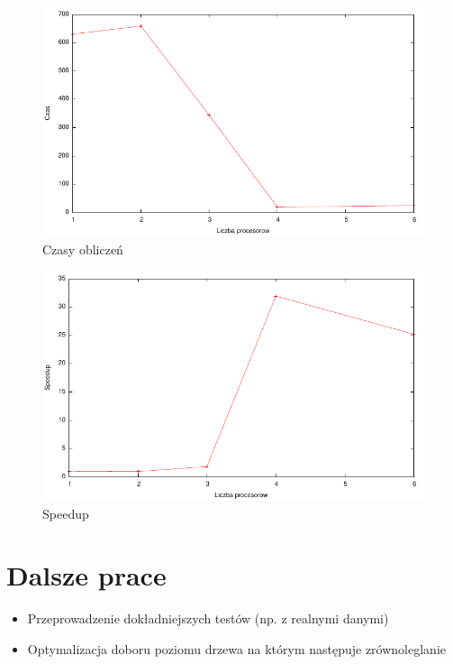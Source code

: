 \documentclass[a4paper]{article}
\begin{document}
\begin{figure}[H] 
   \centering
   \includegraphics[width=0.7\columnwidth]{czas.pdf}
   \caption{Czasy obliczeń}
\end{figure}

\begin{figure}[H] 
   \centering
   \includegraphics[width=0.7\columnwidth]{speedup.pdf}
   \caption{Speedup}
\end{figure}

\section{Dalsze prace}

\begin{itemize}
    \item Przeprowadzenie dokładniejszych testów (np. z realnymi danymi)
    \item Optymalizacja doboru poziomu drzewa na którym następuje zrównoleglanie
\end{itemize}
\end{document}
